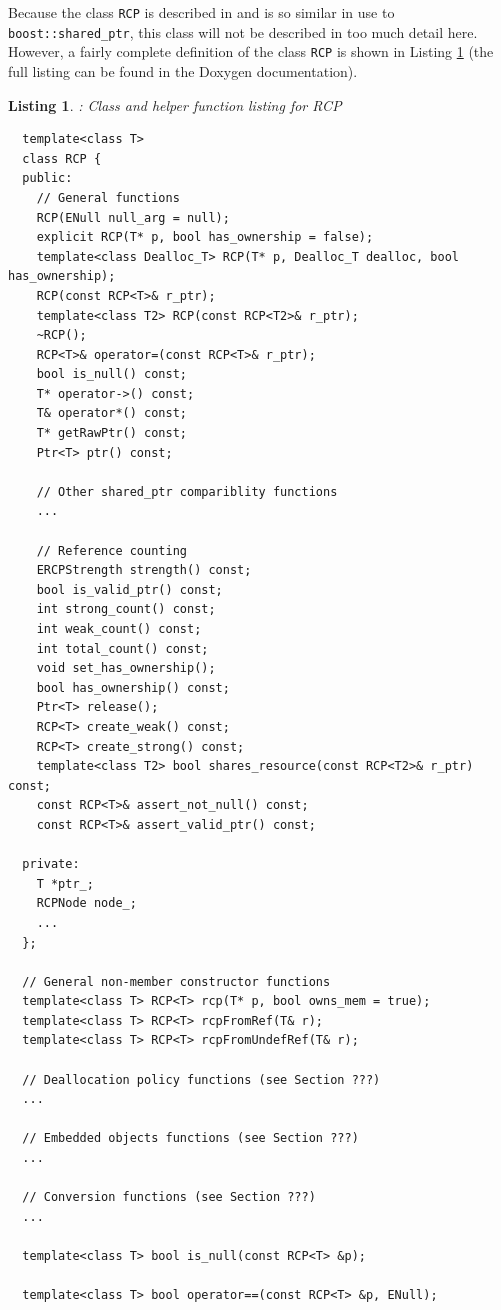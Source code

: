 \documentclass[pdf,ps2pdf,11pt]{SANDreport}
\newtheorem{listing}{Listing}
\begin{document}
Because the class {}\texttt{RCP} is described in
{}\cite{RefCountPtrBeginnersGuide} and is so similar in use to
{}\texttt{boost::shared\_ptr}, this class will not be described in too
much detail here.  However, a fairly complete definition of the class
{}\texttt{RCP} is shown in Listing {}\ref{listing:RCP} (the full
listing can be found in the Doxygen documentation).

\begin{listing}: Class and helper function listing for RCP \\
\label{listing:RCP}
{\small\begin{verbatim}
  template<class T>
  class RCP {
  public:
    // General functions
    RCP(ENull null_arg = null);
    explicit RCP(T* p, bool has_ownership = false);
    template<class Dealloc_T> RCP(T* p, Dealloc_T dealloc, bool has_ownership);
    RCP(const RCP<T>& r_ptr);
    template<class T2> RCP(const RCP<T2>& r_ptr);
    ~RCP();
    RCP<T>& operator=(const RCP<T>& r_ptr);
    bool is_null() const;
    T* operator->() const;
    T& operator*() const;
    T* getRawPtr() const;
    Ptr<T> ptr() const;
  
    // Other shared_ptr compariblity functions
    ...
  
    // Reference counting 
    ERCPStrength strength() const;
    bool is_valid_ptr() const;
    int strong_count() const;
    int weak_count() const;
    int total_count() const;
    void set_has_ownership();
    bool has_ownership() const;
    Ptr<T> release();
    RCP<T> create_weak() const;
    RCP<T> create_strong() const;
    template<class T2> bool shares_resource(const RCP<T2>& r_ptr) const;
    const RCP<T>& assert_not_null() const;
    const RCP<T>& assert_valid_ptr() const;
  
  private:
    T *ptr_;
    RCPNode node_;
    ...
  };

  // General non-member constructor functions
  template<class T> RCP<T> rcp(T* p, bool owns_mem = true);
  template<class T> RCP<T> rcpFromRef(T& r);
  template<class T> RCP<T> rcpFromUndefRef(T& r);

  // Deallocation policy functions (see Section ???)
  ...

  // Embedded objects functions (see Section ???)
  ...
 
  // Conversion functions (see Section ???)
  ...
  
  template<class T> bool is_null(const RCP<T> &p);
  
  template<class T> bool operator==(const RCP<T> &p, ENull);
  

\end{verbatim}}
\end{listing}
\end{document}
